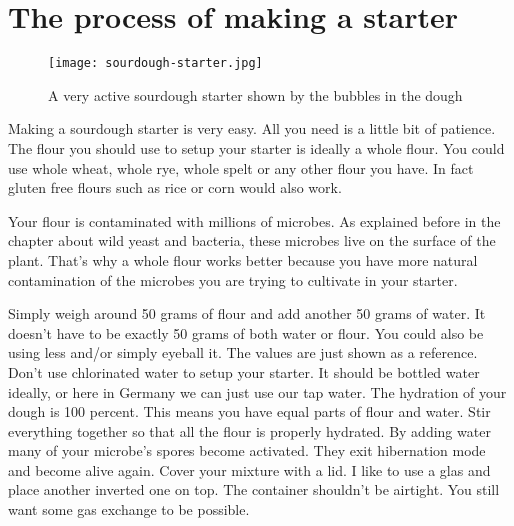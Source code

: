 \section{The process of making a starter}

\begin{figure}[!htb]
  \texttt{[image: sourdough-starter.jpg]}
  \caption{A very active sourdough starter shown by the bubbles in the dough}
  \label{fig:sourdough-starter}
\end{figure}

Making a sourdough starter is very easy. All you need
is a little bit of patience. The flour you should
use to setup your starter is ideally a whole flour.
You could use whole wheat, whole rye, whole spelt or
any other flour you have. In fact gluten free flours such
as rice or corn would also work.

Your flour is contaminated with millions of microbes. As explained
before in the chapter about wild yeast and bacteria, these
microbes live on the surface of the plant. That's why
a whole flour works better because you have more natural
contamination of the microbes you are trying to cultivate
in your starter.

Simply weigh around 50 grams of flour and add another 50
grams of water. It doesn't have to be exactly 50 grams of both
water or flour. You could also be using less and/or simply eyeball
it. The values are just shown as a reference. Don't use chlorinated
water to setup your starter. It should be bottled water ideally,
or here in Germany we can just use our tap water. The hydration 
of your dough is 100 percent. This means you have equal parts
of flour and water. Stir everything together so that all the flour
is properly hydrated.  By adding water many of your microbe's
spores become activated. They exit hibernation mode and
become alive again. Cover your mixture with a lid. I like to 
use a glas and place another inverted one on top. The container shouldn't
be airtight. You still want some gas exchange to be possible.

